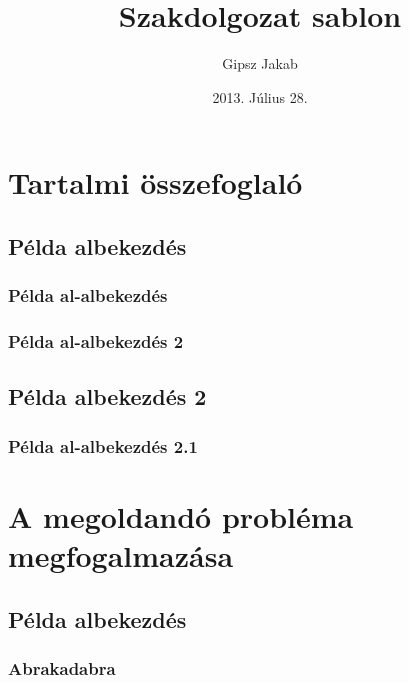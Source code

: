 \documentclass[]{oe-kvk-szakdolgozat}
\author{Gipsz Jakab}
\title{Szakdolgozat sablon}
\date{2013. Július 28.}
\begin{document}
\section{Tartalmi összefoglaló}
\lipsum[1]
\subsection{Példa albekezdés}
\lipsum[1]
\subsubsection{Példa al-albekezdés}
\lipsum[1]
\subsubsection{Példa al-albekezdés 2}
\lipsum[1]
\subsection{Példa albekezdés 2}
\lipsum[1]
\subsubsection{Példa al-albekezdés 2.1}
\lipsum[1]
\section{A megoldandó probléma megfogalmazása}
\lipsum[1]
\subsection{Példa albekezdés}
\lipsum[1]
\subsubsection{Abrakadabra}
\lipsum[2-3]
\end{document}
